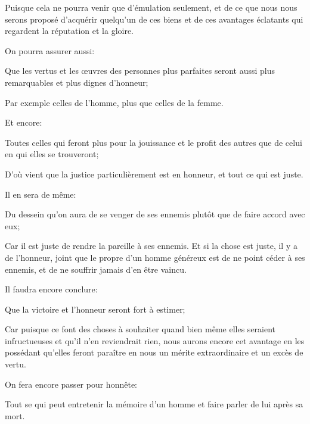 Puisque cela ne pourra venir que d'émulation seulement, et de ce que nous nous serons proposé d'acquérir quelqu'un
de ces biens et de ces avantages éclatants qui regardent la réputation et la gloire. 

\bigbreak

On pourra assurer aussi:

\begin{lieu}
	Que les vertus et les œuvres des personnes plus parfaites seront aussi plus remarquables et plus dignes d'honneur;
\end{lieu}

Par exemple celles de l'homme, plus que celles de la femme. 

\bigbreak

Et encore:

\begin{lieu}
	Toutes celles qui feront plus pour la jouissance et le profit des autres que de celui en qui elles se trouveront;
\end{lieu}

D'où vient que la justice particulièrement est en honneur, et tout ce qui est juste.

\bigbreak

Il en sera de même:

\begin{lieu}
	Du dessein qu'on aura de se venger de ses ennemis plutôt que de faire accord avec eux;
\end{lieu}

Car il est juste de rendre la pareille à ses ennemis. Et si la chose est juste, il y a de l'honneur, joint que le
propre d'un homme généreux est de ne point céder à ses ennemis, et de ne souffrir jamais d'en être vaincu.

\bigbreak

Il faudra encore conclure:

\begin{lieu}
	Que la victoire et l'honneur seront fort à estimer;
\end{lieu}

Car puisque ce font des choses à souhaiter quand bien même elles seraient infructueuses et qu'il n'en reviendrait
rien, nous aurons encore cet avantage en les possédant qu'elles feront paraître en nous un mérite extraordinaire
et un excès de vertu. 

\bigbreak

On fera encore passer pour honnête:

\begin{lieu}
	Tout se qui peut entretenir la mémoire d'un homme et faire parler de lui après sa mort.
\end{lieu}

